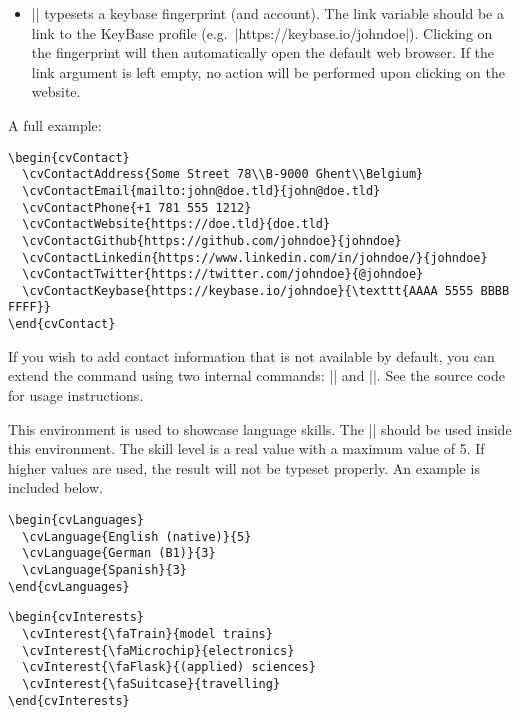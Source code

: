 \documentclass{ltxdoc}
\begin{document}
\begin{itemize}
    \item \DescribeMacro{\cvContactKeybase} || typesets a keybase fingerprint (and account). The link variable should be a link to the KeyBase profile (e.g.\ |https://keybase.io/johndoe|). Clicking on the fingerprint will then automatically open the default web browser. If the link argument is left empty, no action will be performed upon clicking on the website.
  \end{itemize}
  
  A full example:
  \begin{lstlisting}
\begin{cvContact}
  \cvContactAddress{Some Street 78\\B-9000 Ghent\\Belgium}
  \cvContactEmail{mailto:john@doe.tld}{john@doe.tld}
  \cvContactPhone{+1 781 555 1212}
  \cvContactWebsite{https://doe.tld}{doe.tld}
  \cvContactGithub{https://github.com/johndoe}{johndoe}
  \cvContactLinkedin{https://www.linkedin.com/in/johndoe/}{johndoe}
  \cvContactTwitter{https://twitter.com/johndoe}{@johndoe}
  \cvContactKeybase{https://keybase.io/johndoe}{\texttt{AAAA 5555 BBBB FFFF}}
\end{cvContact}
  \end{lstlisting}

  If you wish to add contact information that is not available by default, you can extend the command using two internal commands: |\cv@ContactTemplateLink| and |\cv@ContactTemplate|. See the source code for usage instructions.

   This environment is used to showcase language skills. The \DescribeMacro{\cvLanguage} || should be used inside this environment. The skill level is a real value with a maximum value of 5. If higher values are used, the result will not be typeset properly. An example is included below.

  \begin{lstlisting}
\begin{cvLanguages}
  \cvLanguage{English (native)}{5}
  \cvLanguage{German (B1)}{3}
  \cvLanguage{Spanish}{3}
\end{cvLanguages}  
  \end{lstlisting}


  \begin{lstlisting}
\begin{cvInterests}
  \cvInterest{\faTrain}{model trains}
  \cvInterest{\faMicrochip}{electronics}
  \cvInterest{\faFlask}{(applied) sciences}
  \cvInterest{\faSuitcase}{travelling}
\end{cvInterests}
  \end{lstlisting}
\end{document}
